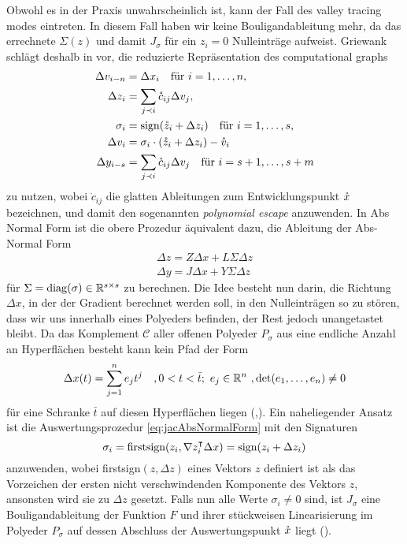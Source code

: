 Obwohl es in der Praxis unwahrscheinlich ist, kann der Fall des valley tracing modes eintreten.
In diesem Fall haben wir keine Bouligandableitung mehr, da das errechnete $\Sigma(z)$ und damit $J_\sigma$ für ein $z_i=0$ Nulleinträge aufweist. Griewank schlägt deshalb in \cite[S.29]{monster} vor, die reduzierte Repräsentation des computational graphs 
\begin{equation}
 \begin{aligned}
  \Delta v_{i-n} &= \Delta x_i \quad \text{für } i=1,\ldots,n, \\
  \Delta z_i &= \sum_{j\prec i} \mathring c_{ij}\Delta v_j,\\
  \sigma_i& = \text{sign}(\mathring z_i + \Delta z_i) \quad \text{für } i=1,\ldots,s,\\
  \Delta v_i &= \sigma_i \cdot (\mathring z_i+\Delta z_i) - \mathring{v}_i\\
  \Delta y_{i-s}& = \sum_{j\prec i} \mathring c_{ij} \Delta v_j \quad \text{für } i=s+1, \ldots, s+m
 \end{aligned}
 \label{eq:minComputationalGraphRepr}
\end{equation}
zu nutzen, wobei $\mathring c_{ij}$ die glatten Ableitungen zum Entwicklungspunkt $\mathring{x}$ bezeichnen, und damit den sogenannten \textit{polynomial escape} anzuwenden. In Abs Normal Form ist die obere Prozedur äquivalent dazu, die Ableitung der Abs-Normal Form 
\begin{equation}
\begin{aligned}
  \Delta z = Z\Delta x + L\Sigma \Delta z \\
 \Delta y = J\Delta x + Y\Sigma \Delta z  
\end{aligned}
\label{eq:jacAbsNormalForm}
\end{equation}
für $\Sigma = \operatorname{diag}(\sigma) \in \mathbb{R}^{s\times s}$ zu berechnen. Die Idee besteht nun darin, die Richtung $\Delta x$, in der der Gradient berechnet werden soll, in den Nulleinträgen so zu stören, dass wir uns innerhalb eines Polyeders befinden, der Rest jedoch unangetastet bleibt. Da das Komplement $\mathcal C$ aller offenen Polyeder $P_\sigma$ aus eine endliche Anzahl an Hyperflächen  besteht kann kein Pfad der Form
\begin{equation}
 \Delta x(t) = \sum_{j=1}^n e_j t^j \quad ,0<t<\bar t;~e_j\in \mathbb{R}^n ~,\det(e_1,\ldots,e_n)\neq 0
\end{equation}
für eine Schranke $\bar t$ auf diesen Hyperflächen liegen (\cite[Proposition 6]{monster},\cite[S.11]{plan}). 
Ein naheliegender Ansatz ist die Auswertungsprozedur \eqref{eq:jacAbsNormalForm} mit den Signaturen
\[
 \sigma_i = \text{firstsign}(z_i,\nabla z_i^\intercal\Delta x) = \text{sign}(z_i+\Delta z_i)
\]
anzuwenden, wobei firstsign$(z,\Delta z)$ eines Vektors $z$ definiert ist als das Vorzeichen der ersten nicht verschwindenden Komponente des Vektors $z$, ansonsten wird sie zu $\Delta z$ gesetzt. Falls nun alle Werte $\sigma_i \neq 0$ sind, ist $J_\sigma$ eine Bouligandableitung der Funktion $F$ und ihrer stückweisen Linearisierung im Polyeder $P_\sigma$ auf dessen Abschluss der Auswertungspunkt $\mathring{x}$ liegt (\cite[S.]{monster}).

